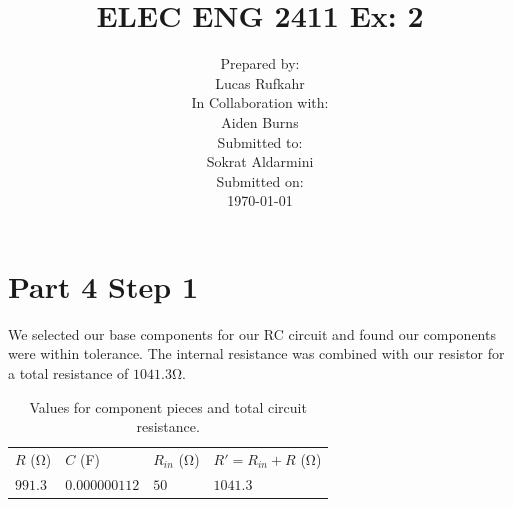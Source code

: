 \documentclass[a4paper, 10pt]{article}
\title{ELEC ENG 2411 Ex: 2\vspace{5em}
}
\author{
	{\Large Prepared by:}\\
	Lucas Rufkahr\vspace{5em}\\
	{\Large In Collaboration with:}\\
	Aiden Burns\vspace{5em}\\
	{\Large Submitted to:}\\
	Sokrat Aldarmini\vspace{5em}\\
	{\Large Submitted on:}\\
	\today
}
\date{}
\begin{document}
\setcounter{secnumdepth}{4}
\pagestyle{fancy}
\maketitle
\thispagestyle{empty}
\pagebreak
\section*{Part 4 Step 1}
We selected our base components for our RC circuit and found our components were within tolerance. The internal resistance was combined with our resistor for a total resistance of $1041.3\si{\ohm}$.
\begin{table}[H]
        \centering
        \begin{tabularx}{0.7\linewidth}{YYYY}
		$R$ (\si{\ohm}) & $C$ (F) & $R_{in}$ (\si{\ohm}) & $R' = R_{in} + R$ (\si{\ohm})\\
		$991.3$ & $0.000000112$ & $50$ & $1041.3$\\
        \end{tabularx}
	\caption{Values for component pieces and total circuit resistance.}
	\label{tab:component_values}
\end{table}
\end{document}
